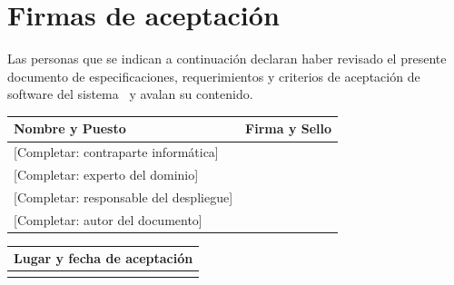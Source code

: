 \chapter{Firmas de aceptación}
\label{ch:firmas}

Las personas que se indican a continuación declaran haber revisado el presente documento de especificaciones, requerimientos y criterios de aceptación de software del sistema \dercassistema\ y avalan su contenido.

\vspace{1cm}

\begin{center}
\begin{tabular}{p{7cm}p{5cm}}
  \toprule
  Nombre y Puesto & Firma y Sello \\
  \midrule
  \rule{0pt}{2.2cm}[Completar: contraparte informática] & \\[1.6cm]
  \rule{0pt}{2.2cm}[Completar: experto del dominio] & \\[1.6cm]
  \rule{0pt}{2.2cm}[Completar: responsable del despliegue] & \\[1.6cm]
  \rule{0pt}{2.2cm}[Completar: autor del documento] & \\[1.6cm]
  \bottomrule
\end{tabular}
\end{center}

\vspace{1cm}

\begin{center}
\begin{tabular}{p{7cm}}
  \toprule
  Lugar y fecha de aceptación \\
  \midrule
  \rule{0pt}{1.4cm} \\
  \bottomrule
\end{tabular}
\end{center}
